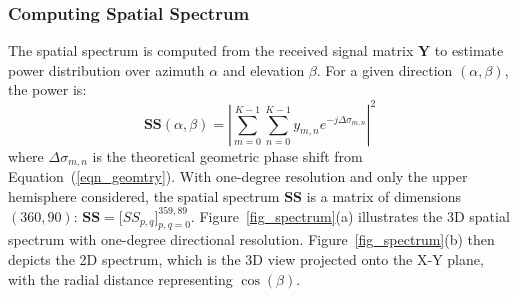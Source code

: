 \subsubsection{Computing Spatial Spectrum}\label{sec_spectrum}
The spatial spectrum is computed from the received signal matrix $\mathbf{Y}$ to estimate power distribution over azimuth $\alpha$ and elevation $\beta$. 
For a given direction $(\alpha, \beta)$, the power is:
\begin{equation}
\mathbf{SS}(\alpha, \beta) = \left| \sum_{m=0}^{K-1} \sum_{n=0}^{K-1} y_{m,n} e^{-j \Delta \sigma_{m,n}} \right|^2
\end{equation}
where $\Delta \sigma_{m,n}$ is the theoretical geometric phase shift from Equation~(\ref{eqn_geomtry}).
With one-degree resolution and only the upper hemisphere considered, the spatial spectrum $\mathbf{SS}$ is a matrix of dimensions $(360, 90)$:
$\mathbf{SS} = \big[SS_{p,q}\big]_{p,q=0}^{359, 89}.$
Figure~\ref{fig_spectrum}(a) illustrates the 3D spatial spectrum with one-degree directional resolution. 
Figure~\ref{fig_spectrum}(b) then depicts the 2D spectrum, which is the 3D view projected onto the X-Y plane, with the radial distance representing $\cos(\beta)$.



